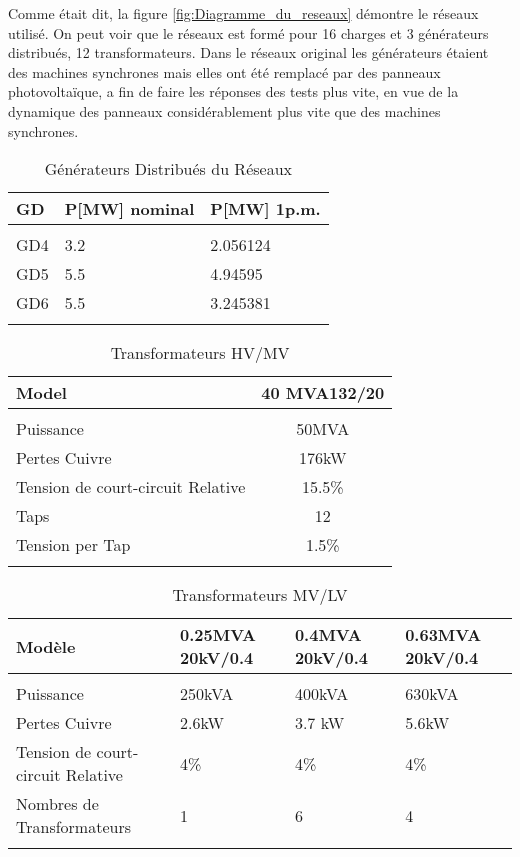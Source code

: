 Comme était dit, la figure \ref{fig:Diagramme_du_reseaux} démontre le réseaux utilisé. On peut voir que le réseaux est formé pour 16 charges et 3 générateurs distribués, 12 transformateurs.
Dans le réseaux original les générateurs étaient des machines synchrones mais elles ont été remplacé par des panneaux photovoltaïque, a fin de faire les réponses des tests plus vite, en vue de la dynamique des panneaux considérablement plus vite que des machines synchrones. 

\begin{table}[H]
	\captionsetup{justification=centering,margin=2cm}
	\caption{Générateurs Distribués du Réseaux }
	\centering
	\begin{tabular}{m{1cm}m{1.5cm}m{1.5cm}}
	\hline
	GD&P[MW] nominal&P[MW] 1p.m.\\
	\hline\\
	GD4&3.2&2.056124\\
	GD5&5.5&4.94595\\
	GD6&5.5&3.245381\\
	\hline\\
	\end{tabular}
\end{table}	

\begin{table}[H]
	\captionsetup{justification=centering,margin=2cm}
	\caption{Transformateurs HV/MV }
	\centering
	\begin{tabular}{lc}
		\hline
		Model&40 MVA132/20\\
		\hline\\
		Puissance&50MVA\\
		Pertes Cuivre&176kW\\
		Tension de court-circuit Relative&15.5\%\\
		Taps&12\\
		Tension per Tap&1.5\%\\
		\hline\\
	\end{tabular}
\end{table}	

\begin{table}[H]
	\captionsetup{justification=centering,margin=2cm}
	\caption{Transformateurs MV/LV }
	\centering
	\begin{tabular}{lm{2cm}m{2cm}m{2cm}}
		\hline
		Modèle&0.25MVA 20kV/0.4&0.4MVA 20kV/0.4&0.63MVA 20kV/0.4\\
		\hline\\
		Puissance&250kVA&400kVA&630kVA\\
		Pertes Cuivre&2.6kW&3.7 kW&5.6kW\\
		Tension de court-circuit Relative&4\%&4\%&4\%\\
		Nombres de Transformateurs&1&6&4\\
		\hline\\
	\end{tabular}
\end{table}	

